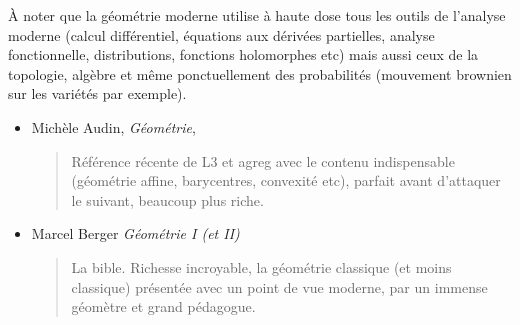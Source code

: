 \documentclass{article}
\begin{document}
À noter que la géométrie moderne utilise à haute dose tous les outils de l'analyse moderne (calcul différentiel, équations aux dérivées partielles, analyse fonctionnelle, distributions, fonctions holomorphes etc) mais aussi ceux de la topologie, algèbre et même ponctuellement des probabilités (mouvement brownien sur les variétés par exemple).
\begin{mdframed}
\begin{itemize}
\item  Michèle Audin, \emph{Géométrie}, 
\begin{quote}
Référence récente de L3 et agreg avec le contenu indispensable (géométrie affine, barycentres, convexité etc), parfait avant d'attaquer le suivant, beaucoup plus riche.
\end{quote}
\end{itemize}
\end{mdframed}
\begin{itemize}
\item Marcel Berger \emph{Géométrie I (et II)}
\begin{quote}
La bible. Richesse incroyable, la géométrie classique (et moins classique) présentée avec un point de vue moderne, par un immense géomètre et grand pédagogue.
\end{quote}
\end{itemize}
\end{document}
